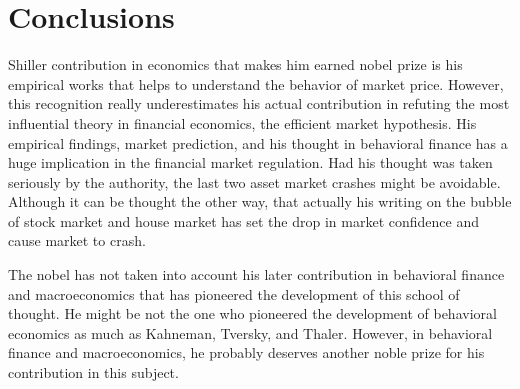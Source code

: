 \documentclass[a4paper, 12pt]{article}
\begin{document}
\section{Conclusions}

Shiller contribution in economics that makes him earned nobel prize is his empirical works that helps to understand the behavior of market price. However, this recognition really underestimates his actual contribution in refuting the most influential theory in financial economics, the efficient market hypothesis. His empirical findings, market prediction, and his thought in behavioral finance has a huge implication in the financial market regulation. Had his thought was taken seriously by the authority, the last two asset market crashes might be avoidable. Although it can be thought the other way, that actually his writing on the bubble of stock market and house market has set the drop in market confidence and cause market to crash.

The nobel has not taken into account his later contribution in behavioral finance and macroeconomics that has pioneered the development of this school of thought. He might be not the one who pioneered the development of behavioral economics as much as Kahneman, Tversky, and Thaler. However, in behavioral finance and macroeconomics, he probably deserves another noble prize for his contribution in this subject.


\end{document}
